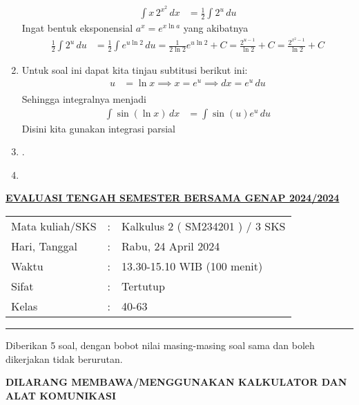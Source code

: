 \documentclass[11pt,openany,a4paper]{article}
\begin{document}
\begin{enumerate}
        \begin{align*}
          \int x \, 2^{x^2} \, dx &= \frac{1}{2}\int 2^u \, du
        \end{align*}
        Ingat bentuk eksponensial $a^x = e^{x \ln a}$ yang akibatnya
        \begin{align*}
          \frac{1}{2}\int 2^u \, du &= \frac{1}{2}\int e^{u \ln 2} \, du = \frac{1}{2\ln 2}e^{u \ln 2} + C = \frac{2^{u-1}}{\ln 2} + C = \boxed{\frac{2^{x^2 - 1}}{\ln 2} + C}
        \end{align*}
        \item Untuk soal ini dapat kita tinjau subtitusi berikut ini:
        \begin{align*}
          u &= \ln x \implies x=e^u \implies dx = e^u \, du \\
        \end{align*}
        Sehingga integralnya menjadi
        \begin{align*}
          \int \sin(\ln x) \, dx &= \int \sin(u) e^u \, du
        \end{align*}
        Disini kita gunakan integrasi parsial 
        \item .
        \item 
    \end{enumerate}

    \newpage
    \pagestyle{problems}
    
    \begin{center}
	{\underline{\textbf{\MakeUppercase{Evaluasi Tengah Semester Bersama Genap 2024/2024}}}}
    \end{center}

    \begin{center}
	\begin{tabular}{lcl}
		Mata kuliah/SKS & : & Kalkulus 2 ( SM234201 ) / 3 SKS\\
		Hari, Tanggal & : & Rabu, 24 April 2024\\
		Waktu & : & 13.30-15.10 WIB (100 menit)\\
		Sifat & : & Tertutup\\
		Kelas & : & 40-63
	\end{tabular}
    \end{center}
	
    \noindent\rule{\textwidth}{2.pt}
	
    \setlength{\parindent}{5pt}
    \par Diberikan 5 soal, dengan bobot nilai masing-masing soal sama dan boleh dikerjakan tidak berurutan.
    \setlength{\parindent}{5pt}
    \setlength{\parindent}{5pt}
    {\small
    \par \textbf{\MakeUppercase{Dilarang membawa/menggunakan kalkulator dan alat komunikasi}}
    }
    \par {}
	
\end{document}
